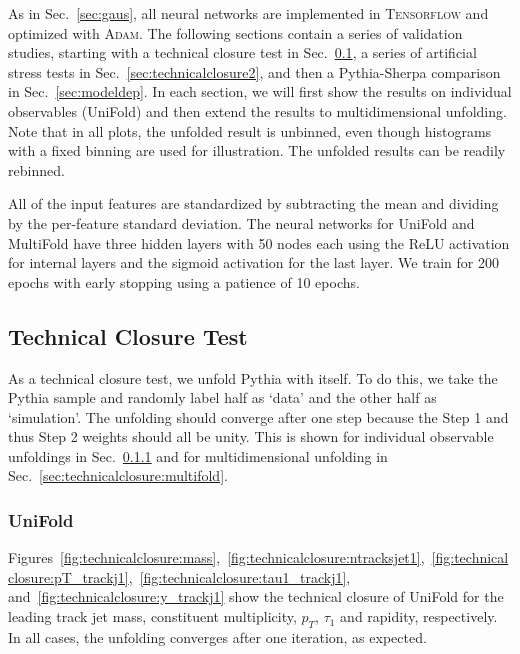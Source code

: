 As in Sec.~\ref{sec:gaus}, all neural networks are implemented in \textsc{Tensorflow} and optimized with \textsc{Adam}.  The following sections contain a series of validation studies, starting with a technical closure test in Sec.~\ref{sec:technicalclosure}, a series of artificial stress tests in Sec.~\ref{sec:technicalclosure2}, and then a Pythia-Sherpa comparison in Sec.~\ref{sec:modeldep}.  In each section, we will first show the results on individual observables (UniFold) and then extend the results to multidimensional unfolding.  Note that in all plots, the unfolded result is unbinned, even though histograms with a fixed binning are used for illustration.  The unfolded results can be readily rebinned.

All of the input features are standardized by subtracting the mean and dividing by the per-feature standard deviation.  The neural networks for UniFold and MultiFold have three hidden layers with 50 nodes each using the ReLU activation for internal layers and the sigmoid activation for the last layer.  We train for 200 epochs with early stopping using a patience of 10 epochs.

\subsection{Technical Closure Test}
\label{sec:technicalclosure}

As a technical closure test, we unfold Pythia with itself.  To do this, we take the Pythia sample and randomly label half as `data' and the other half as `simulation'.   The unfolding should converge after one step because the Step 1 and thus Step 2 weights should all be unity.  This is shown for individual observable unfoldings in Sec.~\ref{sec:technicalclosure:unifold} and for multidimensional unfolding in Sec.~\ref{sec:technicalclosure:multifold}.

\subsubsection{UniFold}
\label{sec:technicalclosure:unifold}

Figures~\ref{fig:technicalclosure:mass},~\ref{fig:technicalclosure:ntracksjet1},~\ref{fig:technicalclosure:pT_trackj1},~\ref{fig:technicalclosure:tau1_trackj1}, and~\ref{fig:technicalclosure:y_trackj1} show the technical closure of UniFold for the leading track jet mass, constituent multiplicity, $p_T$, $\tau_1$ and rapidity, respectively.  In all cases, the unfolding converges after one iteration, as expected.

